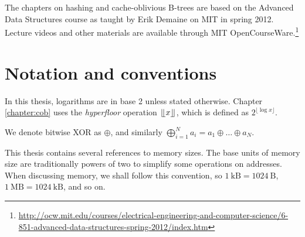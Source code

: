 The chapters on hashing and cache-oblivious B-trees are based on the Advanced
Data Structures course as taught by Erik Demaine on MIT in spring 2012.
Lecture videos and other materials are available through MIT OpenCourseWare.\footnote{%
\url{http://ocw.mit.edu/courses/electrical-engineering-and-computer-science/6-851-advanced-data-structures-spring-2012/index.htm}}

\section*{Notation and conventions}
In this thesis, logarithms are in base 2 unless stated otherwise.
Chapter \ref{chapter:cob} uses the \emph{hyperfloor} operation
$\lfloor \kern -0.22em \lfloor x\rfloor \kern -0.22em \rfloor$, which is defined as $2^{\lfloor\log x\rfloor}$.

We denote bitwise XOR as $\oplus$, and similarly $\bigoplus_{i=1}^N
a_i=a_1\oplus\ldots\oplus a_N$.

This thesis contains several references to memory sizes. The base units of
memory size are traditionally powers of two to simplify some operations on
addresses.
When discussing memory, we shall follow this convention, so
$1\ \mathrm{kB}=1024\ \mathrm{B}$, $1\ \mathrm{MB}=1024\ \mathrm{kB}$,
and so on.
